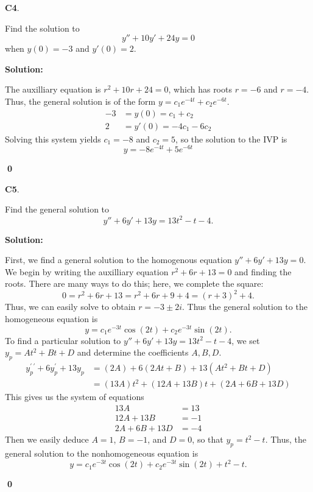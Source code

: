 \documentclass{article}
\newenvironment{problem}[1]
{
  \begin{flushleft}
  \textbf{#1}.
  \ignorespaces
}
{
  \end{flushleft}
}
\newenvironment{solution}
{
  \ignorespaces
  \textbf{Solution:}
}
{
  \ignorespacesafterend
  \begin{flushright}
  {\bfseries \qed}
  \end{flushright}
}
\begin{document}
\begin{problem}{C4}
Find the solution to
\[
y'' + 10y' + 24y = 0
\]
when \(y(0)=-3\) and \(y'(0)=2\).
\end{problem}
\begin{solution}
The auxilliary equation is \(r^2+10r+24=0\), which has roots \(r=-6\) and \(r=-4\).  Thus, the general solution is of the form \(y=c_1e^{-4t}+c_2e^{-6t}\).  
\begin{align*}
-3 &= y(0) = c_1+c_2 \\
2 &= y'(0)  = -4c_1-6c_2 
\end{align*}
Solving this system yields \(c_1 =-8\) and \(c_2 = 5\), so the solution to the IVP is \[y=-8e^{-4t}+5e^{-6t}\]
\end{solution}



\begin{problem}{C5}
Find the general solution to \[y''+6y'+13y=13t^2-t-4.\]
\end{problem}
\begin{solution}
First, we find a general solution to the homogenous equation \(y''+6y'+13y=0\).  We begin by writing the auxilliary equation \(r^2+6r+13=0\) and finding the roots.  There are many ways to do this; here, we complete  the square:
\[0=r^2+6r+13=r^2+6r+9+4=(r+3)^2+4.\]
Thus, we can easily solve to obtain \(r=-3\pm2i\).  Thus the general solution to the homogeneous equation is
\[ y= c_1 e^{-3t} \cos(2t) + c_2 e^{-3t} \sin(2t) .\]
To find a particular solution to  \(y''+6y'+13y=13t^2-t-4\), we set \(y_p=At^2+Bt+D\) and determine the coefficients \(A,B,D\).  
\begin{align*}
y_p ^{\prime\ \prime}+6y_p ^\prime +13y_p &= (2A)+6(2At+B)+13(At^2+Bt+D) \\
&= (13A)t^2 + (12A+13B)t+(2A+6B+13D)
\end{align*}
This gives us the system of equations
\begin{align*}
13A &= 13 \\
12A+13B &= -1 \\
2A+6B+13D &= -4
\end{align*}
Then we easily deduce \(A=1\), \(B=-1\), and \(D=0\), so that \(y_p = t^2-t\).  Thus, the general solution to the nonhomogeneous equation is \[y= c_1 e^{-3t} \cos(2t) + c_2 e^{-3t} \sin(2t) +t^2-t .\]

\end{solution}
\end{document}
